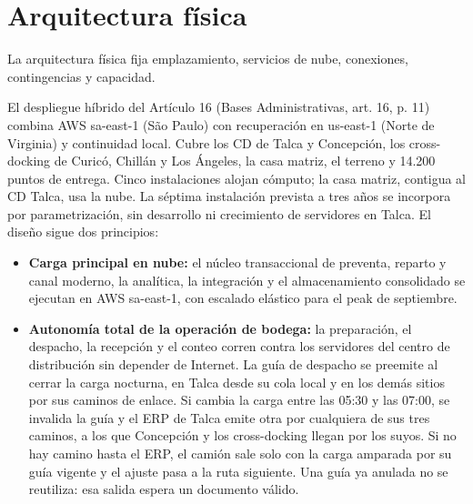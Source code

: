 %
%

\ifdefined\LFXcuerpotablaorig\else
  \let\LFXcuerpotablaorig\LFXcuerpotabla
  \renewcommand{\LFXcuerpotabla}{%
    \LFXcuerpotablaorig\hyphenpenalty=10000\exhyphenpenalty=10000\relax}
\fi

\section{Arquitectura física}
\label{fuente-02-0-arquitectura-fisica}
\label{cap:4-2-arquitectura-fisica}

La arquitectura física fija emplazamiento, servicios de nube, conexiones, contingencias y capacidad.

El despliegue híbrido del Artículo 16\textdegree{} (Bases Administrativas, art. 16, p. 11) combina AWS sa-east-1 (São Paulo) con recuperación en us-east-1 (Norte de Virginia) y continuidad local. Cubre los CD de Talca y Concepción, los cross-docking de Curicó, Chillán y Los Ángeles, la casa matriz, el terreno y 14.200 puntos de entrega. Cinco instalaciones alojan cómputo; la casa matriz, contigua al CD Talca, usa la nube. La séptima instalación prevista a tres años se incorpora por parametrización, sin desarrollo ni crecimiento de servidores en Talca. El diseño sigue dos principios:

\begin{itemize}
  \item \textbf{Carga principal en nube:} el núcleo transaccional de preventa, reparto y canal moderno, la analítica, la integración y el almacenamiento consolidado se ejecutan en AWS sa-east-1, con escalado elástico para el peak de septiembre.
  \item \textbf{Autonomía total de la operación de bodega:} la preparación, el despacho, la recepción y el conteo corren contra los servidores del centro de distribución sin depender de Internet. La guía de despacho se preemite al cerrar la carga nocturna, en Talca desde su cola local y en los demás sitios por sus caminos de enlace. Si cambia la carga entre las 05:30 y las 07:00, se invalida la guía y el ERP de Talca emite otra por cualquiera de sus tres caminos, a los que Concepción y los cross-docking llegan por los suyos. Si no hay camino hasta el ERP, el camión sale solo con la carga amparada por su guía vigente y el ajuste pasa a la ruta siguiente. Una guía ya anulada no se reutiliza: esa salida espera un documento válido.
\end{itemize}

